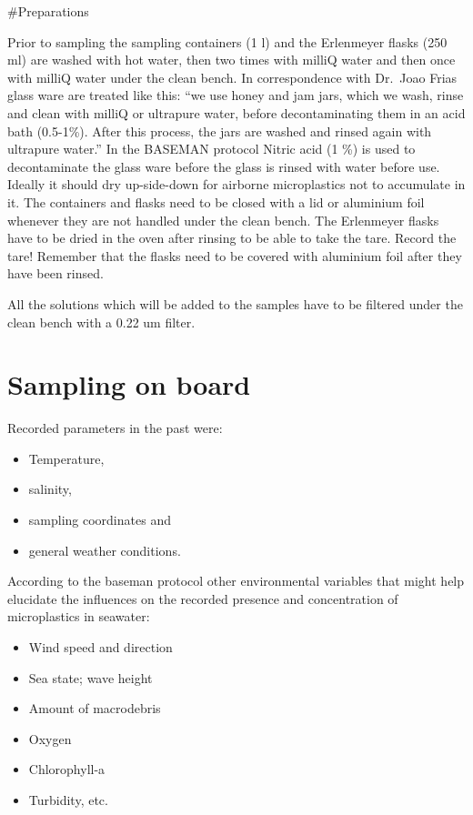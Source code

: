 \documentclass[
  icelandic,
]{book}
\providecommand{\tightlist}{%
  \setlength{\itemsep}{0pt}\setlength{\parskip}{0pt}}
\begin{document}
\#Preparations

Prior to sampling the sampling containers (1 l) and the Erlenmeyer flasks (250 ml) are washed with hot water, then two times with milliQ water and then once with milliQ water under the clean bench.
In correspondence with Dr.~Joao Frias glass ware are treated like this: ``we use honey and jam jars, which we wash, rinse and clean with milliQ or ultrapure water, before decontaminating them in an acid bath (0.5-1\%). After this process, the jars are washed and rinsed again with ultrapure water.''
In the BASEMAN protocol Nitric acid (1 \%) is used to decontaminate the glass ware before the glass is rinsed with water before use. Ideally it should dry up-side-down for airborne microplastics not to accumulate in it.
The containers and flasks need to be closed with a lid or aluminium foil whenever they are not handled under the clean bench.
The Erlenmeyer flasks have to be dried in the oven after rinsing to be able to take the tare. Record the tare! Remember that the flasks need to be covered with aluminium foil after they have been rinsed.

All the solutions which will be added to the samples have to be filtered under the clean bench with a 0.22 um filter.

\hypertarget{sampling-on-board}{%
\chapter{Sampling on board}\label{sampling-on-board}}

Recorded parameters in the past were:

\begin{itemize}
\tightlist
\item
  Temperature,
\item
  salinity,
\item
  sampling coordinates and
\item
  general weather conditions.
\end{itemize}

According to the baseman protocol other environmental variables that might help elucidate the influences on the recorded presence and concentration of microplastics in seawater:

\begin{itemize}
\tightlist
\item
  Wind speed and direction
\item
  Sea state; wave height
\item
  Amount of macrodebris
\item
  Oxygen
\item
  Chlorophyll-a
\item
  Turbidity, etc.
\end{itemize}
\end{document}
